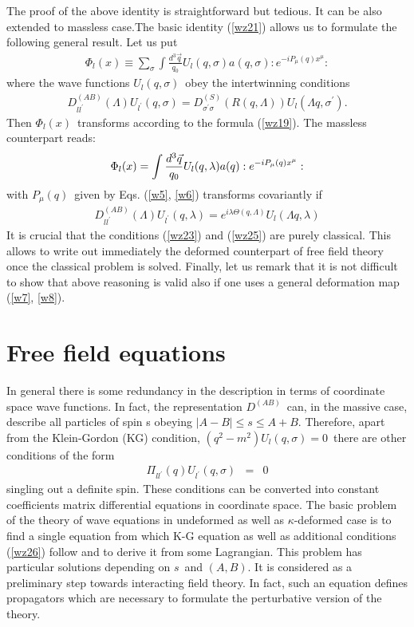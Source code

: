 \documentclass[a4paper,a4paper]{article}
\begin{document}
The proof of the above identity is straightforward but tedious.
It can be also extended to massless case.\newline The basic
identity (\ref{wz21}) allows us to formulate the following general result.
Let us put
\begin{eqnarray}\label{wz22}
\Phi_{l}(x)\equiv \sum_{\sigma}\int \frac{d^{3}\vec{q}}{q_{0}}%
U_{l}(q,\sigma)a(q,\sigma):e^{-iP_{\mu}(q)x^{\mu}}:
\end{eqnarray}
where the wave functions $U_{l}(q,\sigma)$\ obey the intertwinning
conditions
\begin{eqnarray}\label{wz23}
D_{ll^{\prime}}^{(AB)}(\Lambda)U_{l^{\prime}}(q,\sigma)=D_{\sigma
^{\prime}\sigma}^{(S)}
(R(q,\Lambda))U_{l}(\Lambda q,\sigma ^{\prime}).
\end{eqnarray}
Then $\Phi_{l}(x)$\ transforms according to the formula
(\ref{wz19}). The
massless counterpart reads:
\begin{eqnarray}\label{wz24}
\Phi_{l}(x)=\int \frac{d^{3}\vec{q}}{q_{0}}U_{l}(q,\lambda)a(q):e^{-
iP_{%
\mu}(q)x^{\mu}}:
\end{eqnarray}
with $P_{\mu}(q)$\ given by
Eqs.
 (\ref{w5}, \ref{w6}) transforms covariantly if
\begin{eqnarray}\label{wz25}
D_{ll^{\prime}}^{(AB)}(\Lambda)U_{l^{\prime}}(q,\lambda)=e^{i\lambda
\Theta
(q,\Lambda)}U_{l}(\Lambda q,\lambda)
\end{eqnarray}
It is crucial that the conditions (\ref{wz23}) and
(\ref{wz25}) are purely
classical. This allows to write out immediately the deformed
counterpart of free field theory once the classical problem is
solved. Finally, let us remark that it is not difficult to show
that above reasoning is valid also if one uses a general
deformation map
(\ref{w7}, \ref{w8}).

\section{Free field equations}

In general there is some redundancy in the description in terms of
coordinate space wave functions. In fact, the representation
$D^{(AB)}$\
can, in the massive case, describe all particles of spin s obeying
$\mid
A-B\mid \leq s \leq A+B$. Therefore, apart from the Klein-Gordon
 (KG)  condition, $%
(q^2-m^2)U_{l}(q,\sigma)=0$\ there are other conditions of the form
\begin{eqnarray}\label{wz26}
\Pi_{ll^{\prime}}(q)U_{l^{\prime}}(q,\sigma )&=&0
\end{eqnarray}
singling out a definite spin. These conditions can be converted
into constant coefficients matrix differential equations in
coordinate space. The basic problem of the theory of wave
equations in undeformed as well as $\kappa$-deformed case  is to
find a single equation from which K-G equation as well as
additional conditions
(\ref{wz26}) follow and to derive it from some
Lagrangian. This problem has particular solutions depending on
$s$\ and $(A,B)$.  It is considered as a preliminary step towards
interacting field theory. In fact, such an equation defines
propagators which are necessary to formulate the perturbative
version of the theory.
\end{document}
